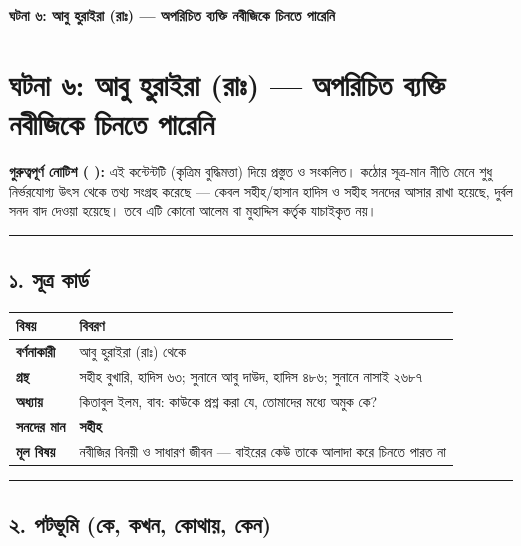 

\begin{center}{\Large\bfseries\color{emerald} ঘটনা ৬: আবু হুরাইরা (রাঃ) — অপরিচিত ব্যক্তি নবীজিকে চিনতে পারেনি}\end{center}
\vspace{1em}
\section*{ঘটনা ৬: আবু হুরাইরা (রাঃ) — অপরিচিত ব্যক্তি নবীজিকে চিনতে পারেনি}

\begin{warnbox}
 \textbf{গুরুত্বপূর্ণ নোটিশ ( ):} এই কন্টেন্টটি  (কৃত্রিম বুদ্ধিমত্তা) দিয়ে প্রস্তুত ও সংকলিত।  কঠোর সূত্র-মান নীতি মেনে শুধু নির্ভরযোগ্য উৎস থেকে তথ্য সংগ্রহ করেছে — কেবল সহীহ/হাসান হাদিস ও সহীহ সনদের আসার রাখা হয়েছে, দুর্বল সনদ বাদ দেওয়া হয়েছে। তবে এটি কোনো আলেম বা মুহাদ্দিস কর্তৃক যাচাইকৃত নয়।
\end{warnbox}


\medskip\hrule\medskip

\subsection*{১. সূত্র কার্ড}

\begin{table}[h]\centering\small
\begin{tabular}{ll}
বিষয় & বিবরণ \\
\hline
\textbf{বর্ণনাকারী} & আবু হুরাইরা (রাঃ) থেকে \\
\textbf{গ্রন্থ} & সহীহ বুখারি, হাদিস ৬৩; সুনানে আবু দাউদ, হাদিস ৪৮৬; সুনানে নাসাই ২৬৮৭ \\
\textbf{অধ্যায়} & কিতাবুল ইলম, বাব: কাউকে প্রশ্ন করা যে, তোমাদের মধ্যে অমুক কে? \\
\textbf{সনদের মান} & \textbf{সহীহ} \\
\textbf{মূল বিষয়} & নবীজির বিনয়ী ও সাধারণ জীবন — বাইরের কেউ তাকে আলাদা করে চিনতে পারত না \\
\hline
\end{tabular}
\end{table}

\medskip\hrule\medskip

\subsection*{২. পটভূমি (কে, কখন, কোথায়, কেন)}

